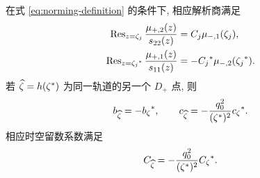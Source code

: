 \begin{proposition}\label{prop:respair}
在式 \eqref{eq:norming-definition} 的条件下, 相应解析商满足
\begin{align}
\operatorname{Res}_{z=\zeta_j}\dfrac{\mu_{+,2}(z)}{s_{22}(z)}
&=C_j\mu_{-,1}(\zeta_j),\label{eq:resplus}\\
\operatorname{Res}_{z={\zeta_j}^{*}}\dfrac{\mu_{+,1}(z)}{s_{11}(z)}
&=-{C_j}^{*}\mu_{-,2}({\zeta_j}^{*}).\label{eq:resminus}
\end{align}
若 $\widehat\zeta=h({\zeta}^{*})$ 为同一轨道的另一个 $D_+$ 点, 则
\begin{equation}\label{eq:cpair}
b_{\widehat\zeta}=-{b_\zeta}^{*},\qquad
c_{\widehat\zeta}=-\dfrac{q_0^2}{({\zeta}^{*})^2}{c_\zeta}^{*}.
\end{equation}
相应时空留数系数满足
\begin{equation}\label{eq:Cpair}
C_{\widehat\zeta}=-\dfrac{q_0^2}{({\zeta}^{*})^2}{C_\zeta}^{*}.
\end{equation}
\end{proposition}
